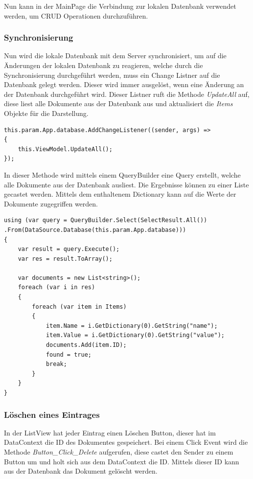Nun kann in der MainPage die Verbindung zur lokalen Datenbank verwendet werden, um CRUD Operationen durchzuführen.

\subsubsection{Synchronisierung}

Nun wird die lokale Datenbank mit dem Server synchronisiert, um auf die Änderungen der lokalen Datenbank zu reagieren, welche durch die Synchronisierung durchgeführt werden, muss ein Change Listner auf die Datenbank gelegt werden. Dieser wird immer ausgelöst, wenn eine Änderung an der Datenbank durchgeführt wird. Dieser Listner ruft die Methode \textit{UpdateAll} auf, diese liest alle Dokumente aus der Datenbank aus und aktualisiert die \textit{Items} Objekte für die Darstellung.

\begin{verbatim}
this.param.App.database.AddChangeListener((sender, args) =>
{
	this.ViewModel.UpdateAll();
});
\end{verbatim}

In dieser Methode wird mittels einem QueryBuilder eine Query erstellt, welche alle Dokumente aus der Datenbank ausliest. Die Ergebnisse können zu einer Liste gecastet werden. Mittels dem enthaltenem Dictionary kann auf die Werte der Dokumente zugegriffen werden. \cite{couchbasegettingstarted}

\begin{verbatim}
using (var query = QueryBuilder.Select(SelectResult.All())
.From(DataSource.Database(this.param.App.database)))
{
	var result = query.Execute();
	var res = result.ToArray();
	
	var documents = new List<string>();
	foreach (var i in res)
	{
		foreach (var item in Items)
		{
			item.Name = i.GetDictionary(0).GetString("name");
			item.Value = i.GetDictionary(0).GetString("value");
			documents.Add(item.ID);
			found = true;
			break;
		}
	}
}
\end{verbatim}

\subsubsection{Löschen eines Eintrages}

In der ListView hat jeder Eintrag einen Löschen Button, dieser hat im DataContext die ID des Dokumentes gespeichert. Bei einem Click Event wird die Methode \textit{Button\_Click\_Delete} aufgerufen, diese castet den Sender zu einem Button um und holt sich aus dem DataContext die ID. Mittels dieser ID kann aus der Datenbank das Dokument gelöscht werden. \cite{uwpbutton}

